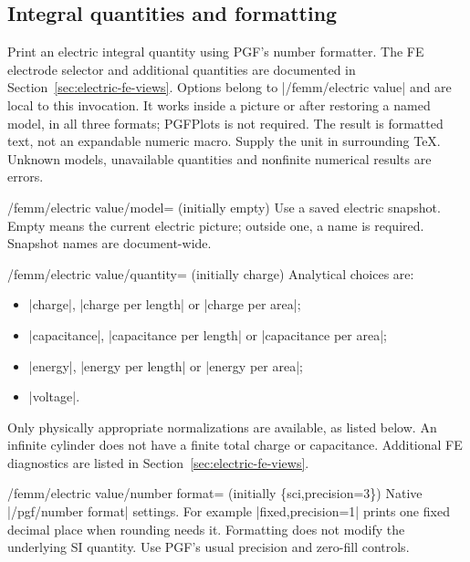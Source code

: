 \subsection{Integral quantities and formatting}
\label{sec:electric-classic-values}
\begin{command}{\femmelectricvalue{}}
Print an electric integral quantity using PGF's number formatter.
The FE electrode selector and additional quantities are documented in
Section~\ref{sec:electric-fe-views}. Options
belong to |/femm/electric value| and are local to this invocation. It works
inside a picture or after restoring a named model, in all three formats;
PGFPlots is not required. The result is formatted text, not an expandable
numeric macro. Supply the unit in surrounding TeX. Unknown models, unavailable
quantities and nonfinite numerical results are errors.
\end{command}
\begin{key}{/femm/electric value/model= (initially \normalfont empty)}
Use a saved electric snapshot. Empty means the current electric picture;
outside one, a name is required. Snapshot names are document-wide.
\end{key}
\begin{key}{/femm/electric value/quantity= (initially charge)}
Analytical choices are:
\begin{itemize}
\item |charge|, |charge per length| or |charge per area|;
\item |capacitance|, |capacitance per length| or |capacitance per area|;
\item |energy|, |energy per length| or |energy per area|;
\item |voltage|.
\end{itemize}
Only physically appropriate normalizations are available, as listed below.
An infinite cylinder does not have a finite total charge or capacitance.
Additional FE diagnostics are listed in Section~\ref{sec:electric-fe-views}.
\end{key}
\begin{key}{/femm/electric value/number format= (initially \{sci,precision=3\})}
Native |/pgf/number format| settings. For example |fixed,precision=1| prints
one fixed decimal place when rounding needs it. Formatting does not modify
the underlying SI quantity. Use PGF's usual precision and zero-fill controls.
\end{key}

